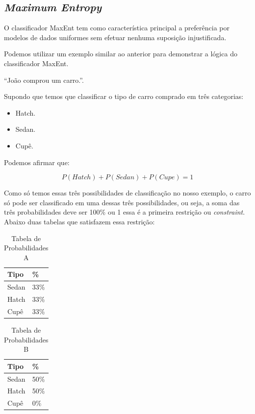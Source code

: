 \subsection{\textit{Maximum Entropy}}
O classificador \ac{MaxEnt} tem como
característica principal a preferência por modelos de dados uniformes sem efetuar nenhuma suposição injustificada.

Podemos utilizar um exemplo similar ao anterior para demonstrar a lógica do
classificador \ac{MaxEnt}. 
 
``João comprou um carro.''.

Supondo que temos que classificar o tipo de carro comprado em três categorias:

\begin{itemize}
  \item Hatch.
  \item Sedan.
  \item Cupê.
\end{itemize}

Podemos afirmar que:

\[ P(Hatch) + P (Sedan) + P(Cupe) = 1 \]

Como só temos essas três possibilidades de classificação no nosso
exemplo, o carro só pode ser classificado em uma dessas três possibilidades, ou
seja, a soma das três probabilidades deve ser 100\% ou 1 essa é a primeira
restrição ou \textit{constraint}. Abaixo duas tabelas que satisfazem essa
restrição:

\begin{table}[htb]
\centering
\begin{tabular}{|l|l|}
\hline
Tipo  & \%   \\ \hline
Sedan & 33\% \\ \hline
Hatch & 33\% \\ \hline
Cupê  & 33\% \\ \hline
 \end{tabular}
\caption{Tabela de Probabilidades A} 
\end{table}
\begin{table}[htb]
\centering
 \begin{tabular}{|l|l|}
\hline
Tipo  & \%   \\ \hline
Sedan & 50\% \\ \hline
Hatch & 50\% \\ \hline
Cupê  & 0\% \\ \hline
 \end{tabular}  
\caption{Tabela de Probabilidades B} 
\end{table}

